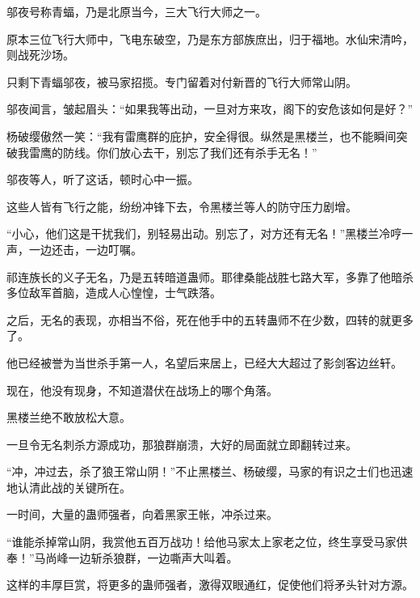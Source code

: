 \begin{this_body}
邬夜号称青蝠，乃是北原当今，三大飞行大师之一。

原本三位飞行大师中，飞电东破空，乃是东方部族庶出，归于福地。水仙宋清吟，则战死沙场。

只剩下青蝠邬夜，被马家招揽。专门留着对付新晋的飞行大师常山阴。

邬夜闻言，皱起眉头：“如果我等出动，一旦对方来攻，阁下的安危该如何是好？”

杨破缨傲然一笑：“我有雷鹰群的庇护，安全得很。纵然是黑楼兰，也不能瞬间突破我雷鹰的防线。你们放心去干，别忘了我们还有杀手无名！”

邬夜等人，听了这话，顿时心中一振。

这些人皆有飞行之能，纷纷冲锋下去，令黑楼兰等人的防守压力剧增。

“小心，他们这是干扰我们，别轻易出动。别忘了，对方还有无名！”黑楼兰冷哼一声，一边还击，一边叮嘱。

祁连族长的义子无名，乃是五转暗道蛊师。耶律桑能战胜七路大军，多靠了他暗杀多位敌军首脑，造成人心惶惶，士气跌落。

之后，无名的表现，亦相当不俗，死在他手中的五转蛊师不在少数，四转的就更多了。

他已经被誉为当世杀手第一人，名望后来居上，已经大大超过了影剑客边丝轩。

现在，他没有现身，不知道潜伏在战场上的哪个角落。

黑楼兰绝不敢放松大意。

一旦令无名刺杀方源成功，那狼群崩溃，大好的局面就立即翻转过来。

“冲，冲过去，杀了狼王常山阴！”不止黑楼兰、杨破缨，马家的有识之士们也迅速地认清此战的关键所在。

一时间，大量的蛊师强者，向着黑家王帐，冲杀过来。

“谁能杀掉常山阴，我赏他五百万战功！给他马家太上家老之位，终生享受马家供奉！”马尚峰一边斩杀狼群，一边嘶声大叫着。

这样的丰厚巨赏，将更多的蛊师强者，激得双眼通红，促使他们将矛头针对方源。

\end{this_body}

